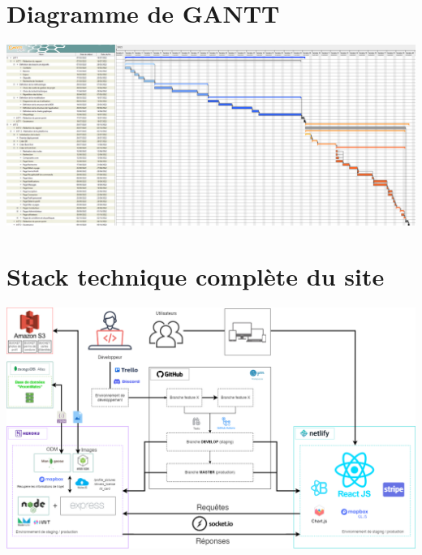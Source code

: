 \begin{landscape}
\section{Diagramme de GANTT}
\label{Diagramme de GANTT}
\begin{center}
\includegraphics[width=\linewidth]{medias/gantt.png}
\end{center}

\section{Stack technique complète du site}
\label{Stack technique complète du site}
\begin{center}
\includegraphics[width=\linewidth]{medias/stack-structure.png}
\end{center}
\end{landscape}

